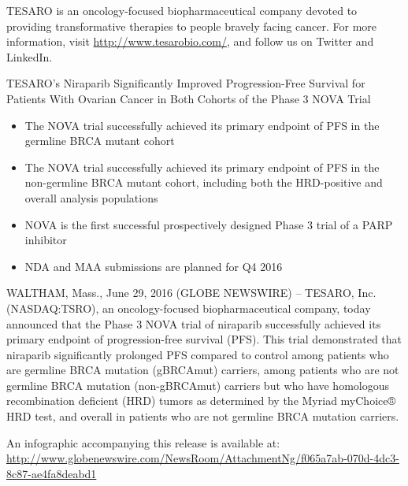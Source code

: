 \documentclass[letterpaper,12pt,english]{sphinxmanual}
\begin{document}
TESARO is an oncology-focused biopharmaceutical company devoted to providing transformative therapies to people bravely facing cancer. For more information, visit \url{http://www.tesarobio.com/}, and follow us on Twitter and LinkedIn.

TESARO's Niraparib Significantly Improved Progression-Free Survival for Patients With Ovarian Cancer in Both Cohorts of the Phase 3 NOVA Trial
\begin{itemize}
\item {} 
The NOVA trial successfully achieved its primary endpoint of PFS in the germline BRCA mutant cohort

\item {} 
The NOVA trial successfully achieved its primary endpoint of PFS in the non-germline BRCA mutant cohort, including both the HRD-positive and overall analysis populations

\item {} 
NOVA is the first successful prospectively designed Phase 3 trial of a PARP inhibitor

\item {} 
NDA and MAA submissions are planned for Q4 2016

\end{itemize}
\begin{figure}[htbp]
\centering

\noindent{}
\end{figure}
\begin{figure}[htbp]
\centering

\noindent{}
\end{figure}

WALTHAM, Mass., June 29, 2016 (GLOBE NEWSWIRE) -- TESARO, Inc. (NASDAQ:TSRO), an oncology-focused biopharmaceutical company, today announced that the Phase 3 NOVA trial of niraparib successfully achieved its primary endpoint of progression-free survival (PFS). This trial demonstrated that niraparib significantly prolonged PFS compared to control among patients who are germline BRCA mutation (gBRCAmut) carriers, among patients who are not germline BRCA mutation (non-gBRCAmut) carriers but who have homologous recombination deficient (HRD) tumors as determined by the Myriad myChoice® HRD test, and overall in patients who are not germline BRCA mutation carriers.

An infographic accompanying this release is available at:
\url{http://www.globenewswire.com/NewsRoom/AttachmentNg/f065a7ab-070d-4dc3-8c87-ae4fa8deabd1}
\end{document}
